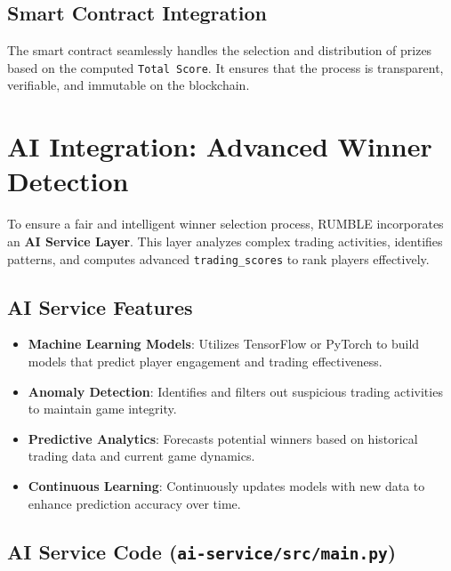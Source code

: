\documentclass[11pt,a4paper]{article}
\begin{document}
\subsection{Smart Contract Integration}

The smart contract seamlessly handles the selection and distribution of prizes based on the computed \texttt{Total Score}. It ensures that the process is transparent, verifiable, and immutable on the blockchain.

\section{AI Integration: Advanced Winner Detection}

To ensure a fair and intelligent winner selection process, RUMBLE incorporates an \textbf{AI Service Layer}. This layer analyzes complex trading activities, identifies patterns, and computes advanced \texttt{trading\_scores} to rank players effectively.

\subsection{AI Service Features}

\begin{itemize}
    \item \textbf{Machine Learning Models}: Utilizes TensorFlow or PyTorch to build models that predict player engagement and trading effectiveness.
    \item \textbf{Anomaly Detection}: Identifies and filters out suspicious trading activities to maintain game integrity.
    \item \textbf{Predictive Analytics}: Forecasts potential winners based on historical trading data and current game dynamics.
    \item \textbf{Continuous Learning}: Continuously updates models with new data to enhance prediction accuracy over time.
\end{itemize}

\subsection{AI Service Code (\texttt{ai-service/src/main.py})}
\end{document}
